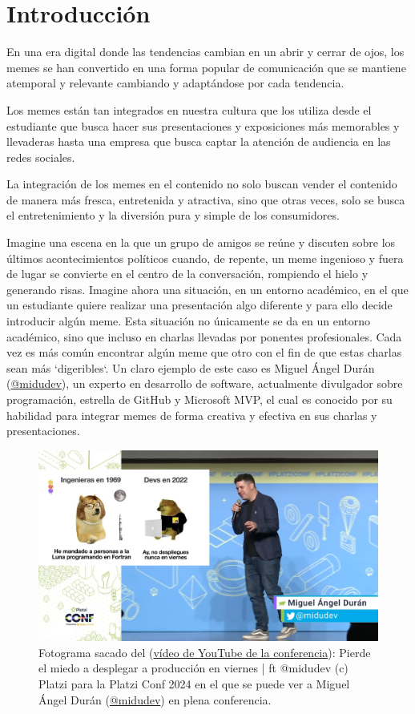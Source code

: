 \chapter{Introducción}

En una era digital donde las tendencias cambian en un abrir y cerrar de ojos, los memes se han convertido en una forma popular de comunicación que se mantiene atemporal y relevante cambiando y adaptándose por cada tendencia.

Los memes están tan integrados en nuestra cultura que los utiliza desde el estudiante que busca hacer sus presentaciones y exposiciones más memorables y llevaderas hasta una empresa que busca captar la atención de audiencia en las redes sociales.

La integración de los memes en el contenido no solo buscan vender el contenido de manera más fresca, entretenida y atractiva, sino que otras veces, solo se busca el entretenimiento y la diversión pura y simple de los consumidores.

Imagine una escena en la que un grupo de amigos se reúne y discuten sobre los últimos acontecimientos políticos cuando, de repente, un meme ingenioso y fuera de lugar se convierte en el centro de la conversación, rompiendo el hielo y generando risas. Imagine ahora una situación, en un entorno académico, en el que un estudiante quiere realizar una presentación algo diferente y para ello decide introducir algún meme. Esta situación no únicamente se da en un entorno académico, sino que incluso en charlas llevadas por ponentes profesionales. Cada vez es más común encontrar algún meme que otro con el fin de que estas charlas sean más `digeribles`. Un claro ejemplo de este caso es Miguel Ángel Durán (\href{https://midu.dev/}{@midudev}), un experto en desarrollo de software, actualmente divulgador sobre programación, estrella de GitHub y Microsoft MVP, el cual es conocido por su habilidad para integrar memes de forma creativa y efectiva en sus charlas y presentaciones.

\begin{figure}[ht]
    \caption{Fotograma sacado del (\href{http://sl.ugr.es/0dXQ}{vídeo de YouTube de la conferencia}): Pierde el miedo a desplegar a producción en viernes | ft @midudev (c) Platzi para la Platzi Conf 2024 en el que se puede ver a Miguel Ángel Durán (\href{https://midu.dev/}{@midudev}) en plena conferencia.}
    \centering
    \vspace*{0.5cm}
    \includegraphics[scale=0.15]{figuras/platziconfmidudev.png}
\end{figure}

